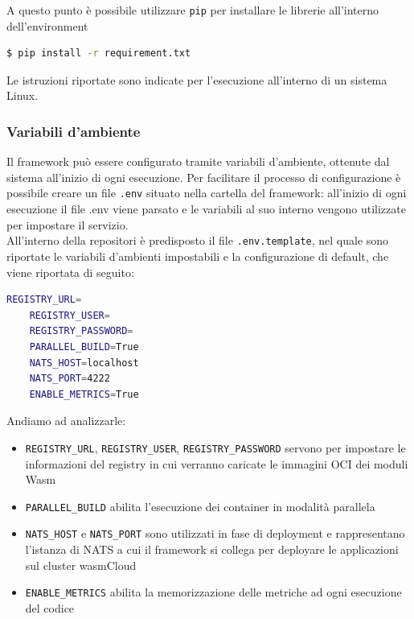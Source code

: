 A questo punto è possibile utilizzare \texttt{pip} per installare le librerie all'interno dell'environment
\begin{lstlisting}[language=bash]
    $ pip install -r requirement.txt
\end{lstlisting}

Le istruzioni riportate sono indicate per l'esecuzione all'interno di un sistema Linux.

\subsubsection{Variabili d'ambiente}

Il framework può essere configurato tramite variabili d'ambiente, ottenute dal sistema all'inizio di ogni esecuzione. Per facilitare il processo di configurazione è possibile creare un file \texttt{.env} situato nella cartella del framework: all'inizio di ogni esecuzione il file .env viene parsato e le variabili al suo interno vengono utilizzate per impostare il servizio.\\
All'interno della repositori è predisposto il file \texttt{.env.template}, nel quale sono riportate le variabili d'ambienti impostabili e la configurazione di default, che viene riportata di seguito:

\begin{lstlisting}[language=bash, caption={Variabili d'ambiente per la configurazione del framework}, captionpos=b, label={code:env}]
    REGISTRY_URL=
    REGISTRY_USER=
    REGISTRY_PASSWORD=
    PARALLEL_BUILD=True
    NATS_HOST=localhost
    NATS_PORT=4222
    ENABLE_METRICS=True
\end{lstlisting}

Andiamo ad analizzarle:
\begin{itemize}
    \item \texttt{REGISTRY\_URL}, \texttt{REGISTRY\_USER}, \texttt{REGISTRY\_PASSWORD} servono per impostare le informazioni del registry in cui verranno caricate le immagini OCI dei moduli Wasm
    \item \texttt{PARALLEL\_BUILD} abilita l'esecuzione dei container in modalità parallela
    \item \texttt{NATS\_HOST} e \texttt{NATS\_PORT} sono utilizzati in fase di deployment e rappresentano l'istanza di NATS a cui il framework si collega per deployare le applicazioni sul cluster wasmCloud
    \item \texttt{ENABLE\_METRICS} abilita la memorizzazione delle metriche ad ogni esecuzione del codice
\end{itemize}

